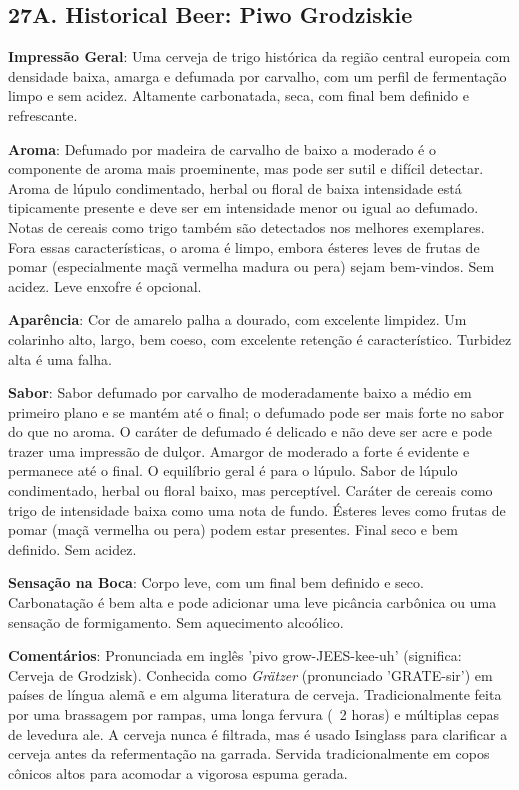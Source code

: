 \subsection*{27A. Historical Beer: Piwo Grodziskie}
\textbf{Impressão Geral}: Uma cerveja de trigo histórica da região central europeia com densidade baixa, amarga e defumada por carvalho, com um perfil de fermentação limpo e sem acidez. Altamente carbonatada, seca, com final bem definido e refrescante.

\textbf{Aroma}: Defumado por madeira de carvalho de baixo a moderado é o componente de aroma mais proeminente, mas pode ser sutil e difícil detectar. Aroma de lúpulo condimentado, herbal ou floral de baixa intensidade está tipicamente presente e deve ser em intensidade menor ou igual ao defumado. Notas de cereais como trigo também são detectados nos melhores exemplares. Fora essas características, o aroma é limpo, embora ésteres leves de frutas de pomar (especialmente maçã vermelha madura ou pera) sejam bem-vindos. Sem acidez. Leve enxofre é opcional.

\textbf{Aparência}: Cor de amarelo palha a dourado, com excelente limpidez. Um colarinho alto, largo, bem coeso, com excelente retenção é característico. Turbidez alta é uma falha.

\textbf{Sabor}: Sabor defumado por carvalho de moderadamente baixo a médio em primeiro plano e se mantém até o final; o defumado pode ser mais forte no sabor do que no aroma. O caráter de defumado é delicado e não deve ser acre e pode trazer uma impressão de dulçor. Amargor de moderado a forte é evidente e permanece até o final. O equilíbrio geral é para o lúpulo. Sabor de lúpulo condimentado, herbal ou floral baixo, mas perceptível. Caráter de cereais como trigo de intensidade baixa como uma nota de fundo. Ésteres leves como frutas de pomar (maçã vermelha ou pera) podem estar presentes. Final seco e bem definido. Sem acidez.

\textbf{Sensação na Boca}: Corpo leve, com um final bem definido e seco. Carbonatação é bem alta e pode adicionar uma leve picância carbônica ou uma sensação de formigamento. Sem aquecimento alcoólico.

\textbf{Comentários}: Pronunciada em inglês 'pivo grow-JEES-kee-uh' (significa: Cerveja de Grodzisk). Conhecida como \textit{Grätzer} (pronunciado 'GRATE-sir') em países de língua alemã e em alguma literatura de cerveja. Tradicionalmente feita por uma brassagem por rampas, uma longa fervura (~2 horas) e múltiplas cepas de levedura ale. A cerveja nunca é filtrada, mas é usado Isinglass para clarificar a cerveja antes da refermentação na garrada. Servida tradicionalmente em copos cônicos altos para acomodar a vigorosa espuma gerada.

